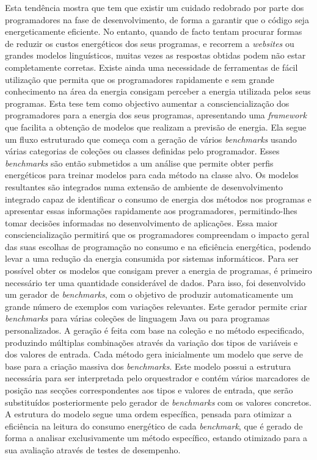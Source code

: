 Esta tendência mostra que tem que existir um cuidado redobrado por parte dos programadores na fase de desenvolvimento, de forma a garantir que o código seja energeticamente eficiente. No entanto, quando de facto tentam procurar formas de reduzir os custos energéticos dos seus programas, e recorrem a \textit{websites} ou grandes modelos linguísticos, muitas vezes as respostas obtidas podem não estar completamente corretas. Existe ainda uma necessidade de ferramentas de fácil utilização que permita que os programadores rapidamente e sem grande conhecimento na área da energia consigam perceber a energia utilizada pelos seus programas.
Esta tese tem como objectivo aumentar a consciencialização dos programadores para a energia dos seus programas, apresentando uma \textit{framework} que facilita a obtenção de modelos que realizam a previsão de energia. Ela segue um fluxo estruturado que começa com a geração de vários \textit{benchmarks} usando várias categorias de coleções ou classes definidas pelo programador. Esses \textit{benchmarks} são então submetidos a um análise que permite obter perfis energéticos para treinar modelos para cada método na classe alvo.
Os modelos resultantes são integrados numa extensão de ambiente de desenvolvimento integrado capaz de identificar o consumo de energia dos métodos nos programas e apresentar essas informações rapidamente aos programadores, permitindo-lhes tomar decisões informadas no desenvolvimento de aplicações.
Essa maior consciencialização permitirá que os programadores compreendam o impacto geral das suas escolhas de programação no consumo e na eficiência energética, podendo levar a uma redução da energia consumida por sistemas informáticos.
Para ser possível obter os modelos que consigam prever a energia de programas, é primeiro necessário ter uma quantidade considerável de dados. Para isso, foi desenvolvido um gerador de \textit{benchmarks}, com o objetivo de produzir automaticamente um grande número de exemplos com variações relevantes.
Este gerador permite criar \textit{benchmarks} para várias coleções de linguagem Java ou para programas personalizados. A geração é feita com base na coleção e no método especificado, produzindo múltiplas combinações através da variação dos tipos de variáveis e dos valores de entrada. 
Cada método gera inicialmente um modelo que serve de base para a criação massiva dos \textit{benchmarks}. Este modelo possui a estrutura necessária para ser interpretada pelo orquestrador e contém vários marcadores de posição nas secções correspondentes aos tipos e valores de entrada, que serão substituídos posteriormente pelo gerador de \textit{benchmarks} com os valores concretos. A estrutura do modelo segue uma ordem específica, pensada para otimizar a eficiência na leitura do consumo energético de cada \textit{benchmark}, que é gerado de forma a analisar exclusivamente um método específico, estando otimizado para a sua avaliação através de testes de desempenho.


